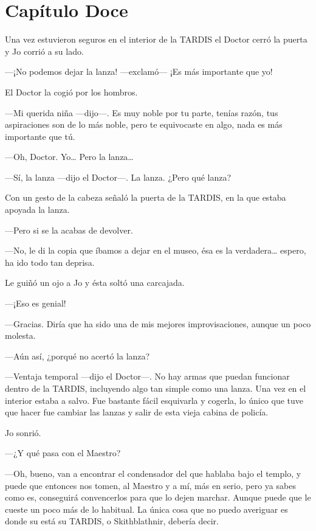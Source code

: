 \chapter*{Capítulo Doce}

Una vez estuvieron seguros en el interior de la TARDIS el Doctor cerró
la puerta y Jo corrió a su lado.

---¡No podemos dejar la lanza! ---exclamó--- ¡Es más importante que yo!

El Doctor la cogió por los hombros.

---Mi querida niña ---dijo---. Es muy noble por tu parte, tenías razón,
tus aspiraciones son de lo más noble, pero te equivocaste en algo, nada
es más importante que tú.

---Oh, Doctor. Yo\ldots{} Pero la lanza\ldots{}

---Sí, la lanza ---dijo el Doctor---. La lanza. ¿Pero qué lanza?

Con un gesto de la cabeza señaló la puerta de la TARDIS, en la que
estaba apoyada la lanza.

---Pero si se la acabas de devolver.

---No, le di la copia que íbamos a dejar en el museo, ésa es la
verdadera\ldots{} espero, ha ido todo tan deprisa.

Le guiñó un ojo a Jo y ésta soltó una carcajada.

---¡Eso es genial!

---Gracias. Diría que ha sido una de mis mejores improvisaciones, aunque
un poco molesta.

---Aún así, ¿porqué no acertó la lanza?

---Ventaja temporal ---dijo el Doctor---. No hay armas que puedan
funcionar dentro de la TARDIS, incluyendo algo tan simple como una
lanza. Una vez en el interior estaba a salvo. Fue bastante fácil
esquivarla y cogerla, lo único que tuve que hacer fue cambiar las lanzas
y salir de esta vieja cabina de policía.

Jo sonrió.

---¿Y qué pasa con el Maestro?

---Oh, bueno, van a encontrar el condensador del que hablaba bajo el
templo, y puede que entonces nos tomen, al Maestro y a mí, más en serio,
pero ya sabes como es, conseguirá convencerlos para que lo dejen
marchar. Aunque puede que le cueste un poco más de lo habitual. La única
cosa que no puedo averiguar es donde su está su TARDIS, o Skithblathnir,
debería decir.


